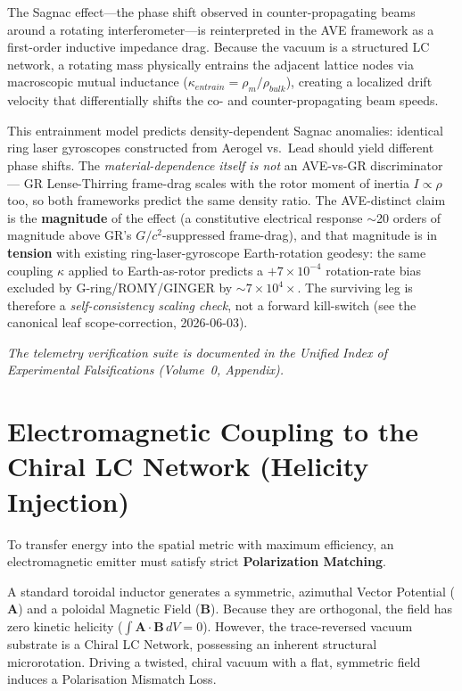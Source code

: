The Sagnac effect---the phase shift observed in counter-propagating beams around a rotating interferometer---is reinterpreted in the AVE framework as a first-order inductive impedance drag. Because the vacuum is a structured LC network, a rotating mass physically entrains the adjacent lattice nodes via macroscopic mutual inductance ($\kappa_{entrain} = \rho_m / \rho_{bulk}$), creating a localized drift velocity that differentially shifts the co- and counter-propagating beam speeds.

This entrainment model predicts density-dependent Sagnac anomalies: identical ring laser gyroscopes constructed from Aerogel vs.\ Lead should yield different phase shifts. The \emph{material-dependence itself is not} an AVE-vs-GR discriminator --- GR Lense-Thirring frame-drag scales with the rotor moment of inertia $I \propto \rho$ too, so both frameworks predict the same density ratio. The AVE-distinct claim is the \textbf{magnitude} of the effect (a constitutive electrical response $\sim$20 orders of magnitude above GR's $G/c^2$-suppressed frame-drag), and that magnitude is in \textbf{tension} with existing ring-laser-gyroscope Earth-rotation geodesy: the same coupling $\kappa$ applied to Earth-as-rotor predicts a $+7\times10^{-4}$ rotation-rate bias excluded by G-ring/ROMY/GINGER by $\sim7\times10^4\times$. The surviving leg is therefore a \emph{self-consistency scaling check}, not a forward kill-switch (see the canonical leaf scope-correction, 2026-06-03).

\textit{The telemetry verification suite is documented in the Unified Index of Experimental Falsifications (Volume~0, Appendix).}




\section{Electromagnetic Coupling to the Chiral LC Network (Helicity Injection)}

To transfer energy into the spatial metric with maximum efficiency, an electromagnetic emitter must satisfy strict \textbf{Polarization Matching}.

A standard toroidal inductor generates a symmetric, azimuthal Vector Potential ($\mathbf{A}$) and a poloidal Magnetic Field ($\mathbf{B}$). Because they are orthogonal, the field has zero kinetic helicity ($\int \mathbf{A} \cdot \mathbf{B} \, dV = 0$). However, the trace-reversed vacuum substrate is a Chiral LC Network, possessing an inherent structural microrotation. Driving a twisted, chiral vacuum with a flat, symmetric field induces a Polarisation Mismatch Loss.

